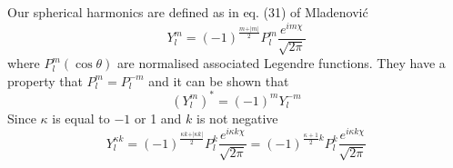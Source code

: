 Our spherical harmonics are defined as in eq. (31) of Mladenovi{\'c} \cite{M.Mladenovic}
\begin{equation}
Y^{m}_{l} =  (-1)^{ \frac{m+\vert m \vert}{2} } P^{m}_{l} \frac{e^{i m \chi} }{\sqrt{2 \pi} }
\end{equation}
where $P^{m}_{l} (\cos \theta)$ are normalised associated Legendre functions.
They have a property that $P^{m}_{l} = P^{-m}_{l}$ and it can be shown that 
\begin{equation}
(Y^{m}_{l})^{*} = (-1)^{m} Y^{-m}_{l}
\end{equation}
Since $\kappa$ is equal to $-1$ or 1 and $k$ is not negative
\begin{equation}
Y^{\kappa k}_{l} = (-1)^{\frac{\kappa k + \vert \kappa k \vert}{2}} P^{k}_{l} \frac{e^{i \kappa k \chi} }{\sqrt{2 \pi} } = 
(-1)^{\frac{\kappa+1}{2} k } P^{k}_{l} \frac{e^{i \kappa k \chi} }{\sqrt{2 \pi} }
\end{equation}


